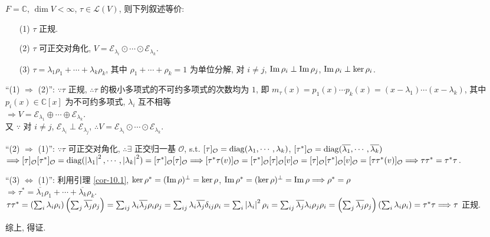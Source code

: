 \documentclass{note}
\begin{document}
\begin{thm}
    $F=\mathbb{C}$, $\dim V<\infty$, $\tau\in\mathcal{L}(V)$, 则下列叙述等价:
    \begin{itemize}
        \item[(1)] $\tau$ 正规.
        \item[(2)] $\tau$ 可正交对角化, $V=\mathcal{E}_{\lambda_i}\odot\cdots\odot\mathcal{E}_{\lambda_k}$.
        \item[(3)] $\tau=\lambda_1\rho_1+\cdots+\lambda_k\rho_k$, 其中 $\rho_1+\cdots+\rho_k=1$ 为单位分解, 对 $i\neq j$, $\operatorname{Im}\rho_i\perp\operatorname{Im}\rho_j$, $\operatorname{Im}\rho_i\perp\ker\rho_i$.
    \end{itemize}
\end{thm}
\begin{pf}
    ``(1) $\Longrightarrow$ (2)'': $\because\tau$ 正规, $\therefore\tau$ 的极小多项式的不可约多项式的次数均为 $1$, 即 $m_{\tau}(x)=p_1(x)\cdots p_k(x)=(x-\lambda_1)\cdots(x-\lambda_k)$, 其中 $p_i(x)\in\mathbb{C}[x]$ 为不可约多项式, $\lambda_i$ 互不相等\\
    $\Longrightarrow V=\mathcal{E}_{\lambda_1}\oplus\cdots\oplus\mathcal{E}_{\lambda_k}$.\\
    又 $\because$ 对 $i\neq j$, $\mathcal{E}_{\lambda_i}\perp\mathcal{E}_{\lambda_j}$, $\therefore V=\mathcal{E}_{\lambda_i}\odot\cdots\odot\mathcal{E}_{\lambda_k}$.

    ``(2) $\Longrightarrow$ (1)'': $\because\tau$ 可正交对角化, $\therefore\exists$ 正交归一基 $\mathcal{O}$, s.t. $[\tau]_{\mathcal{O}}=\operatorname{diag}(\lambda_1,\cdots,\lambda_k)$, $[\tau^*]_{\mathcal{O}}=\operatorname{diag}(\overline{\lambda_1},\cdots,\overline{\lambda_k})$\\
    $\Longrightarrow[\tau]_{\mathcal{O}}[\tau^*]_{\mathcal{O}}=\operatorname{diag}(\left\lvert\lambda_1\right\rvert^2,\cdots,\left\lvert\lambda_k\right\rvert^2)=[\tau^*]_{\mathcal{O}}[\tau]_{\mathcal{O}}\Longrightarrow[\tau^*\tau(v)]_{\mathcal{O}}=[\tau^*]_{\mathcal{O}}[\tau]_{\mathcal{O}}[v]_{\mathcal{O}}=[\tau]_{\mathcal{O}}[\tau^*]_{\mathcal{O}}[v]_{\mathcal{O}}=[\tau\tau^*(v)]_{\mathcal{O}}\Longrightarrow\tau\tau^*=\tau^*\tau$.

    ``(3) $\Longleftrightarrow$ (1)'': 利用引理 \ref{cor-10.1}, $\ker\rho^*=(\operatorname{Im}\rho)^{\perp}=\ker\rho$, $\operatorname{Im}\rho^*=(\ker\rho)^{\perp}=\operatorname{Im}\rho\Longrightarrow\rho^*=\rho$\\
    $\Longrightarrow\tau^*=\overline{\lambda_1}\rho_1+\cdots+\overline{\lambda_k}\rho_k$.\\
    $\tau\tau^*=\left(\sum_i\lambda_i\rho_i\right)\left(\sum_j\overline{\lambda_j}\rho_j\right)=\sum_{ij}\lambda_i\overline{\lambda_j}\rho_i\rho_j=\sum_{ij}\lambda_i\overline{\lambda_j}\delta_{ij}\rho_i=\sum_i\left\lvert\lambda_i\right\rvert^2\rho_i=\sum_{ij}\overline{\lambda_j}\lambda_i\rho_j\rho_i=\left(\sum_j\overline{\lambda_j}\rho_j\right)\left(\sum_i\lambda_i\rho_i\right)=\tau^*\tau\Longrightarrow\tau$ 正规.

    综上, 得证.
\end{pf}
\end{document}
